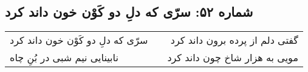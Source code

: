 \begin{center}
\section*{شماره ۵۲: سرّی که دلِ دو کَوْن خون داند کرد}
\label{sec:052}
\begin{longtable}{l p{0.5cm} r}
سرّی که دلِ دو کَوْن خون داند کرد
&&
گفتی دلم از پرده برون داند کرد
\\
نابینایی نیم شبی در بُنِ چاه
&&
مویی به هزار شاخ چون داند کرد
\\
\end{longtable}
\end{center}
